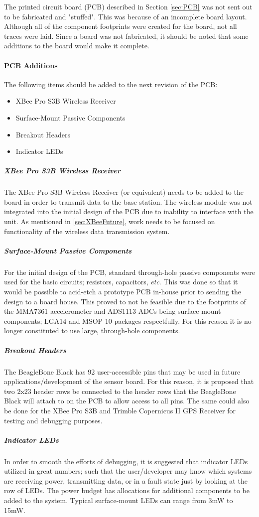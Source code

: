 The printed circuit board (PCB) described in Section \ref{sec:PCB} was not sent out to be fabricated and "stuffed".
This was because of an incomplete board layout.
Although all of the component footprints were created for the board, not all traces were laid.
Since a board was not fabricated, it should be noted that some additions to the board would make it complete.

\paragraph{PCB Additions}
The following items should be added to the next revision of the PCB:
\begin{itemize}
\item XBee Pro S3B Wireless Receiver
\item Surface-Mount Passive Components
\item Breakout Headers
\item Indicator LEDs
\end{itemize}

\subparagraph{XBee Pro S3B Wireless Receiver}
The XBee Pro S3B Wireless Receiver (or equivalent) needs to be added to the board in order to transmit data to the base station. 
The wireless module was not integrated into the initial design of the PCB due to inability to interface with the unit.
As mentioned in \ref{sec:XBeeFuture}, work needs to be focused on functionality of the wireless data transmission system.
\subparagraph{Surface-Mount Passive Components}
For the initial design of the PCB, standard through-hole passive components were used for the basic circuits; resistors, capacitors, \textit{etc}.
This was done so that it would be possible to acid-etch a prototype PCB in-house prior to sending the design to a board house.
This proved to not be feasible due to the footprints of the MMA7361 accelerometer and ADS1113 ADCs being surface mount components; LGA14 and MSOP-10 packages respectfully.
For this reason it is no longer constituted to use large, through-hole components.
\subparagraph{Breakout Headers}
The BeagleBone Black has 92 user-accessible pins that may be used in future applications/development of the sensor board.
For this reason, it is proposed that two 2x23 header rows be connected to the header rows that the BeagleBone Black will attach to on the PCB to allow access to all pins. 
The same could also be done for the XBee Pro S3B and Trimble Copernicus II GPS Receiver for testing and debugging purposes.
\subparagraph{Indicator LEDs}
In order to smooth the efforts of debugging, it is suggested that indicator LEDs utilized in great numbers; such that the user/developer may know which systems are receiving power, transmitting data, or in a fault state just by looking at the row of LEDs.
The power budget has allocations for additional components to be added to the system.
Typical surface-mount LEDs can range from  3mW to 15mW. 